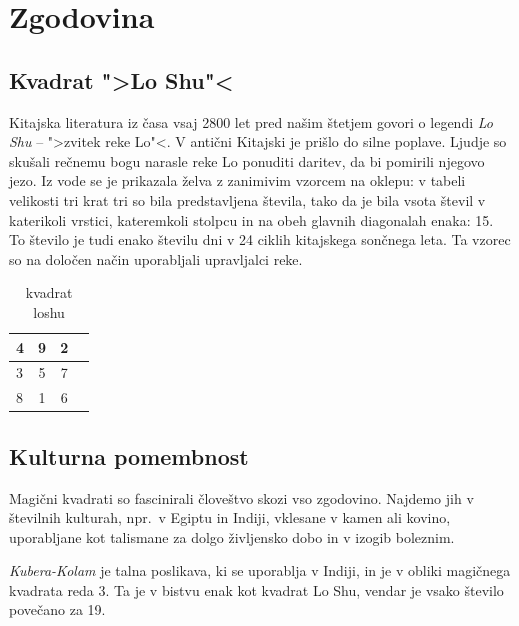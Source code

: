 \documentclass[a4paper,12pt]{article}
\newcommand{\pojem}[1]{\emph{\color{purple}#1}}
\begin{document}

\section{Zgodovina}

\subsection{Kvadrat ">Lo Shu"<}

Kitajska literatura iz časa vsaj 2800 let pred našim štetjem govori o legendi
\pojem{Lo Shu} -- ">zvitek reke Lo"<. V antični Kitajski je prišlo do
silne poplave. Ljudje so skušali rečnemu bogu narasle reke Lo ponuditi daritev,
da bi pomirili njegovo jezo. Iz vode se je prikazala želva z zanimivim vzorcem
na oklepu: v tabeli velikosti tri krat tri so bila predstavljena števila, tako
da je bila vsota števil v katerikoli vrstici, kateremkoli stolpcu in na obeh
glavnih diagonalah enaka: 15. To število je tudi enako številu dni v 24 ciklih
kitajskega sončnega leta. Ta vzorec so na določen način uporabljali upravljalci
reke.

\begin{table}[hpt]
   \centering
   \normalsize
   \caption{kvadrat loshu}
   \label{table:loshu}
   \begin{tabular}{|l|c|c|c|}
      \hline
   4 & 9 & 2 \\\hline
   3 & 5 & 7 \\\hline
   8 & 1 & 6 \\\hline
   \end{tabular}
\end{table}


\subsection{Kulturna pomembnost}

Magični kvadrati so fascinirali človeštvo skozi vso zgodovino. Najdemo jih
v številnih kulturah, npr.\ v Egiptu in Indiji, vklesane v kamen ali
kovino, uporabljane kot talismane za dolgo življensko dobo in v
izogib boleznim.

\pojem{Kubera-Kolam} je talna poslikava, ki se uporablja v Indiji, in je v
obliki magičnega kvadrata reda 3. Ta je v bistvu enak kot kvadrat
Lo Shu, vendar je vsako število povečano za 19.
\end{document}

